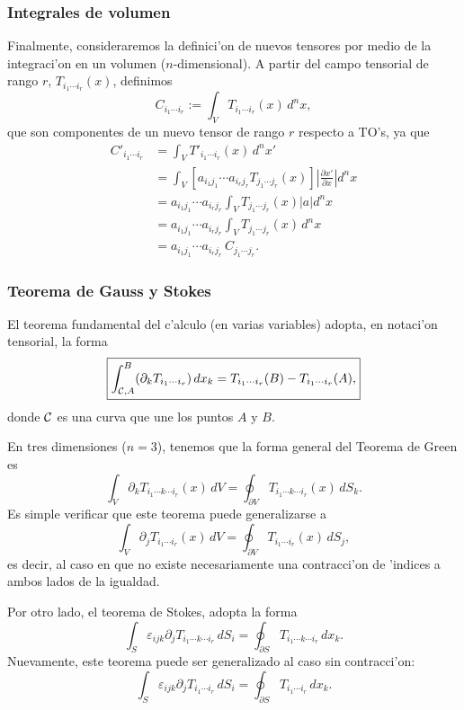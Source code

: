 \subsubsection{Integrales de volumen}
Finalmente, consideraremos la definici'on de nuevos tensores por medio de la integraci'on en un volumen ($n$-dimensional). A partir del campo tensorial de rango $r$, $T_{i_1\cdots i_r}(x)$, definimos
\begin{equation}
C_{i_1\cdots i_r}:=\int_V T_{i_1\cdots i_r}(x)\,d^nx,
\end{equation}
que son componentes de un nuevo tensor de rango $r$ respecto a TO's, ya que
\begin{align}
C'_{i_1\cdots i_r} &= \int_V T'_{i_1\cdots i_r}(x)\,d^nx' \\
&= \int_V \left[a_{i_1j_1}\cdots a_{i_rj_r}T_{j_1\cdots j_r}(x)\right]\left|\frac{\partial x'}{\partial x}\right|d^nx \\
&= a_{i_1j_1}\cdots a_{i_rj_r}\int_V T_{j_1\cdots j_r}(x)\left|a\right|d^nx \\
&= a_{i_1j_1}\cdots a_{i_rj_r}\int_V T_{j_1\cdots j_r}(x)\,d^nx \\ 
&= a_{i_1j_1}\cdots a_{i_rj_r}\,C_{j_1\cdots j_r}.
\end{align} 

\subsubsection{Teorema de Gauss y Stokes}
El teorema fundamental del c'alculo (en varias variables) adopta, en notaci'on tensorial, la forma
\begin{equation}
\boxed{\int_{{\cal C},A}^B (\partial_k T_{i_1\cdots i_r})\,dx_k=T_{i_1\cdots i_r}(B)-T_{i_1\cdots i_r}(A),}
\end{equation}
donde $\cal C$ es una curva que une los puntos $A$ y $B$.

En tres dimensiones ($n=3$), tenemos que la forma general del Teorema de Green es
\begin{equation}
\int_V\partial_kT_{i_1\cdots k\cdots i_r}(x)\,dV=\oint_{\partial V}T_{i_1\cdots k\cdots i_r}(x)\,dS_k.
\end{equation}
Es simple verificar que este teorema puede generalizarse a
\begin{equation}
\boxed{\int_V\partial_jT_{i_1\cdots i_r}(x)\,dV=\oint_{\partial V}T_{i_1\cdots i_r}(x)\,dS_j,}
\end{equation}
es decir, al caso en que no existe necesariamente una contracci'on de 'indices a ambos lados de la igualdad.

Por otro lado, el teorema de Stokes, adopta la forma
\begin{equation}
\int_{S}\varepsilon_{ijk}\partial_jT_{i_1\cdots k\cdots i_r}\,dS_i 
=\oint_{\partial S}T_{i_1\cdots k\cdots i_r}\,dx_k .
\end{equation}
Nuevamente, este teorema puede ser generalizado al caso sin contracci'on:
\begin{equation}
\boxed{\int_{S}\varepsilon_{ijk}\partial_jT_{i_1\cdots i_r}\,dS_i 
=\oint_{\partial S}T_{i_1\cdots i_r}\,dx_k .}
\end{equation}